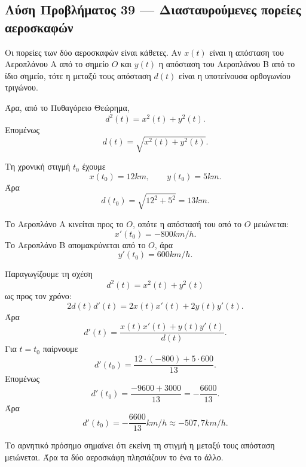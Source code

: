 \subsection*{Λύση Προβλήματος 39 --- Διασταυρούμενες πορείες αεροσκαφών}

\begin{alist}
  \item Οι πορείες των δύο αεροσκαφών είναι κάθετες. Αν $x(t)$ είναι η
        απόσταση του Αεροπλάνου Α από το σημείο $O$ και $y(t)$ η
        απόσταση του Αεροπλάνου Β από το ίδιο σημείο, τότε η μεταξύ τους
        απόσταση $d(t)$ είναι η υποτείνουσα ορθογωνίου τριγώνου.

        Άρα, από το Πυθαγόρειο Θεώρημα,
        \[
          d^2(t)=x^2(t)+y^2(t).
        \]
        Επομένως
        \[
          {d(t)=\sqrt{x^2(t)+y^2(t)}}.
        \]

  \item Τη χρονική στιγμή $t_0$ έχουμε
        \[
          x(t_0)=12\si{km},
          \qquad
          y(t_0)=5\si{km}.
        \]
        Άρα
        \[
          d(t_0)=\sqrt{12^2+5^2}=13\si{km}.
        \]

        Το Αεροπλάνο Α κινείται προς το $O$, οπότε η απόστασή του από το
        $O$ μειώνεται:
        \[
          x'(t_0)=-800\si{km/h}.
        \]
        Το Αεροπλάνο Β απομακρύνεται από το $O$, άρα
        \[
          y'(t_0)=600\si{km/h}.
        \]

        Παραγωγίζουμε τη σχέση
        \[
          d^2(t)=x^2(t)+y^2(t)
        \]
        ως προς τον χρόνο:
        \[
          2d(t)d'(t)=2x(t)x'(t)+2y(t)y'(t).
        \]
        Άρα
        \[
          d'(t)=\frac{x(t)x'(t)+y(t)y'(t)}{d(t)}.
        \]
        Για $t=t_0$ παίρνουμε
        \[
          d'(t_0)
          =
          \frac{12\cdot(-800)+5\cdot600}{13}.
        \]
        Επομένως
        \[
          d'(t_0)
          =
          \frac{-9600+3000}{13}
          =
          -\frac{6600}{13}.
        \]
        Άρα
        \[
          {d'(t_0)=-\frac{6600}{13}\si{km/h}
          \approx -507{,}7\si{km/h}}.
        \]

        Το αρνητικό πρόσημο σημαίνει ότι εκείνη τη στιγμή η μεταξύ τους
        απόσταση μειώνεται. Άρα τα δύο αεροσκάφη πλησιάζουν το ένα το
        άλλο.
\end{alist}
